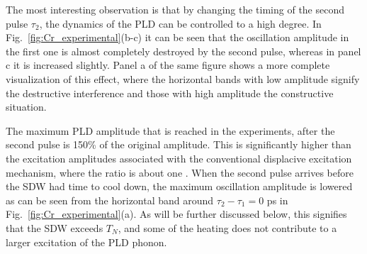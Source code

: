 The most interesting observation is that by changing the timing of the second pulse $\tau_2$, the dynamics of the PLD can be controlled to a high degree.
In Fig.~\ref{fig:Cr_experimental}(b-c) it can be seen that the oscillation amplitude in the first one is almost completely destroyed by the second pulse, whereas in panel c it is increased slightly.
Panel a of the same figure shows a more complete visualization of this effect, where the horizontal bands with low amplitude signify the destructive interference and those with high amplitude the constructive situation.

The maximum PLD amplitude that is reached in the experiments, after the second pulse is 150\% of the original amplitude.
This is significantly higher than the excitation amplitudes associated with the conventional displacive excitation mechanism, where the ratio is about one \cite{Singer2015,Zeiger1992}. 
When the second pulse arrives before the SDW had time to cool down, the maximum oscillation amplitude is lowered as can be seen from the horizontal band around $\tau_2 - \tau_1 = 0$ ps in Fig.~\ref{fig:Cr_experimental}(a).
As will be further discussed below, this signifies that the SDW exceeds $T_N$, and some of the heating does not contribute to a larger excitation of the PLD phonon.

